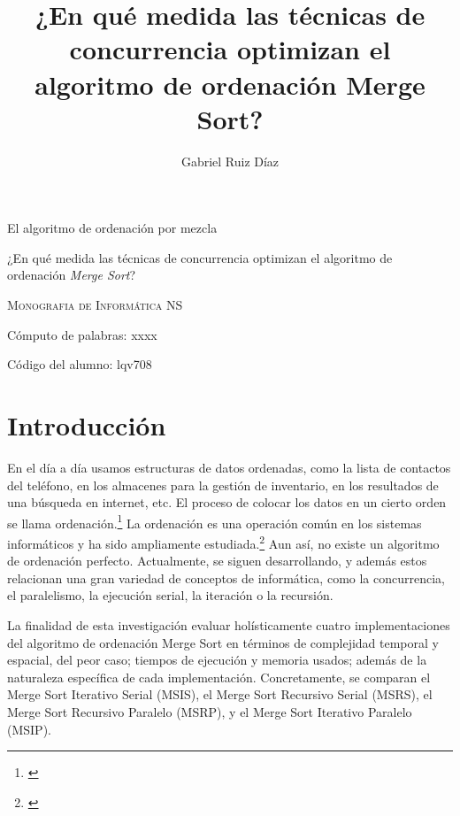 \documentclass[titlepage]{article}
\title{¿En qué medida las técnicas de concurrencia optimizan el algoritmo de ordenación Merge Sort?}
\author{Gabriel Ruiz Díaz}
\date{}
\begin{document}
	
	
\begin{titlepage}
\centering
{\hfill}
\vspace{3cm}

{\Huge El algoritmo de ordenación por mezcla\par}
\vspace{2cm}
{\LARGE ¿En qué medida las técnicas de concurrencia optimizan el algoritmo de ordenación \textit{Merge Sort}? \par}
\vspace{1cm}
{\scshape\large Monografia de Informática NS \par}
\vspace{8cm}


{\Large Cómputo de palabras: xxxx \par}
{\Large Código del alumno: lqv708 \par}
\end{titlepage}

\newpage
\tableofcontents

\newpage
\section{Introducción}
En el día a día usamos estructuras de datos ordenadas, como la lista de contactos del teléfono, en los almacenes para la gestión de inventario, en los resultados de una búsqueda en internet, etc. El proceso de colocar los datos en un cierto orden se llama ordenación.\footnote{\cite{knuth-1997}} La ordenación es una operación común en los sistemas informáticos y ha sido ampliamente estudiada.\footnote{\cite{McMillan-2007}} Aun así, no existe un algoritmo de ordenación perfecto. Actualmente, se siguen desarrollando, y además estos relacionan una gran variedad de conceptos de informática, como la concurrencia, el paralelismo, la ejecución serial, la iteración o la recursión.

La finalidad de esta investigación evaluar holísticamente cuatro implementaciones del algoritmo de ordenación Merge Sort en términos de complejidad temporal y espacial, del peor caso; tiempos de ejecución y memoria usados; además de la naturaleza específica de cada implementación. Concretamente, se comparan el Merge Sort Iterativo Serial (MSIS), el Merge Sort Recursivo Serial (MSRS), el Merge Sort Recursivo Paralelo (MSRP), y el Merge Sort Iterativo Paralelo (MSIP).
\end{document}

